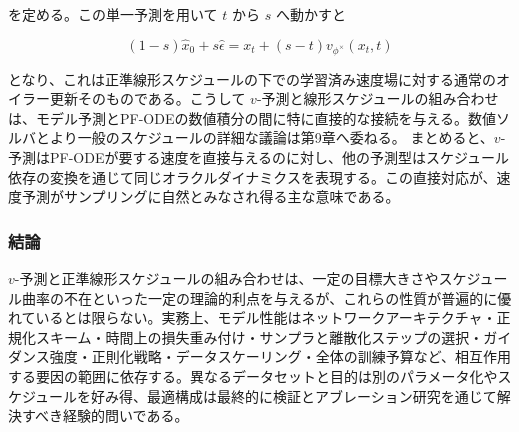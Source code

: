 を定める。この単一予測を用いて $t$ から $s$ へ動かすと

\[
(1-s)\hat{x}_0+s\hat{\epsilon}=x_t+(s-t)v_{\phi^\times}(x_t,t)
\]


となり、これは正準線形スケジュールの下での学習済み速度場に対する通常のオイラー更新そのものである。こうして $v$-予測と線形スケジュールの組み合わせは、モデル予測とPF-ODEの数値積分の間に特に直接的な接続を与える。数値ソルバとより一般のスケジュールの詳細な議論は第9章へ委ねる。
まとめると、$v$-予測はPF-ODEが要する速度を直接与えるのに対し、他の予測型はスケジュール依存の変換を通じて同じオラクルダイナミクスを表現する。この直接対応が、速度予測がサンプリングに自然とみなされ得る主な意味である。

\subsubsection*{結論}


$v$-予測と正準線形スケジュールの組み合わせは、一定の目標大きさやスケジュール曲率の不在といった一定の理論的利点を与えるが、これらの性質が普遍的に優れているとは限らない。実務上、モデル性能はネットワークアーキテクチャ・正規化スキーム・時間上の損失重み付け・サンプラと離散化ステップの選択・ガイダンス強度・正則化戦略・データスケーリング・全体の訓練予算など、相互作用する要因の範囲に依存する。異なるデータセットと目的は別のパラメータ化やスケジュールを好み得、最適構成は最終的に検証とアブレーション研究を通じて解決すべき経験的問いである。

